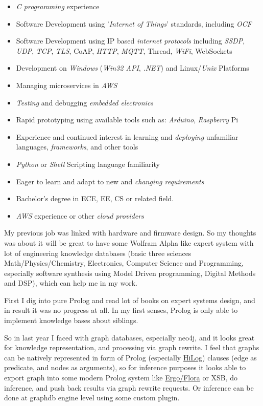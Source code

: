 \begin{framed}\noindent
\begin{itemize}[nosep,leftmargin=*]
\item \emph{C programming} experience
\item Software Development using '\emph{Internet of Things}' standards, including \emph{OCF}
\item Software Development using IP based \emph{internet protocols} including \emph{SSDP}, \emph{UDP}, \emph{TCP}, \emph{TLS}, CoAP, \emph{HTTP}, \emph{MQTT}, Thread, \emph{WiFi}, WebSockets
\item Development on \emph{Windows} (\emph{Win32 API}, \emph{.NET}) and Linux/\emph{Unix} Platforms
\item Managing microservices in \emph{AWS}
\item \emph{Testing} and debugging \emph{embedded electronics}
\item Rapid prototyping using available tools such as: \emph{Arduino}, \emph{Raspberry} Pi
\item Experience and continued interest in learning and \emph{deploying} unfamiliar languages, \emph{frameworks}, and other tools
\item \emph{Python} or \emph{Shell} Scripting language familiarity
\item Eager to learn and adapt to new and \emph{changing requirements}
\item Bachelor's degree in ECE, EE, CS or related field.
\item \emph{AWS} experience or other \emph{cloud providers}
\end{itemize}
\end{framed}

My previous job was linked with hardware and firmware design. So my thoughts was
about it will be great to have some Wolfram Alpha like expert system with lot of
engineering knowledge databases (basic three sciences Math/Physics/Chemistry,
Electronics, Computer Science and Programming, especially software synthesis
using Model Driven programming, Digital Methods and DSP), which can help me in
my work.

First I dig into pure Prolog and read lot of books on expert systems design, and
in result it was no progress at all. In my first senses, Prolog is only able to
implement knowledge bases about siblings.

So in last year I faced with graph databases, especially neo4j, and it looks
great for knowledge representation, and processing via graph rewrite. I feel
that graphs can be natively represented in form of Prolog (especially
\href{https://en.wikipedia.org/wiki/HiLog}{HiLog}) clauses (edge as predicate,
and nodes as arguments), so for inference purposes it looks able to export graph
into some modern Prolog system like
\href{http://flora.sourceforge.net/}{Ergo/Flora} or XSB, do inference, and push
back results via graph rewrite requests. Or inference can be done at graphdb
engine level using some custom plugin.
